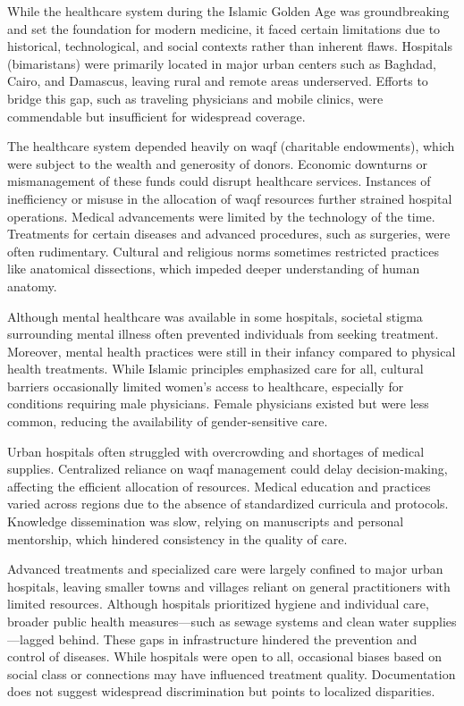 \par
While the healthcare system during the Islamic Golden Age was groundbreaking and set the foundation for modern medicine, it faced certain limitations due to historical, technological, and social contexts rather than inherent flaws.
Hospitals (bimaristans) were primarily located in major urban centers such as Baghdad, Cairo, and Damascus, leaving rural and remote areas underserved. Efforts to bridge this gap, such as traveling physicians and mobile clinics, were commendable but insufficient for widespread coverage.

\par
The healthcare system depended heavily on waqf (charitable endowments), which were subject to the wealth and generosity of donors. Economic downturns or mismanagement of these funds could disrupt healthcare services. Instances of inefficiency or misuse in the allocation of waqf resources further strained hospital operations.
Medical advancements were limited by the technology of the time. Treatments for certain diseases and advanced procedures, such as surgeries, were often rudimentary. Cultural and religious norms sometimes restricted practices like anatomical dissections, which impeded deeper understanding of human anatomy.

\par
Although mental healthcare was available in some hospitals, societal stigma surrounding mental illness often prevented individuals from seeking treatment. Moreover, mental health practices were still in their infancy compared to physical health treatments.
While Islamic principles emphasized care for all, cultural barriers occasionally limited women’s access to healthcare, especially for conditions requiring male physicians. Female physicians existed but were less common, reducing the availability of gender-sensitive care.

\par
Urban hospitals often struggled with overcrowding and shortages of medical supplies. Centralized reliance on waqf management could delay decision-making, affecting the efficient allocation of resources.
Medical education and practices varied across regions due to the absence of standardized curricula and protocols. Knowledge dissemination was slow, relying on manuscripts and personal mentorship, which hindered consistency in the quality of care.

\par
Advanced treatments and specialized care were largely confined to major urban hospitals, leaving smaller towns and villages reliant on general practitioners with limited resources.
Although hospitals prioritized hygiene and individual care, broader public health measures—such as sewage systems and clean water supplies—lagged behind. These gaps in infrastructure hindered the prevention and control of diseases.
While hospitals were open to all, occasional biases based on social class or connections may have influenced treatment quality. Documentation does not suggest widespread discrimination but points to localized disparities.